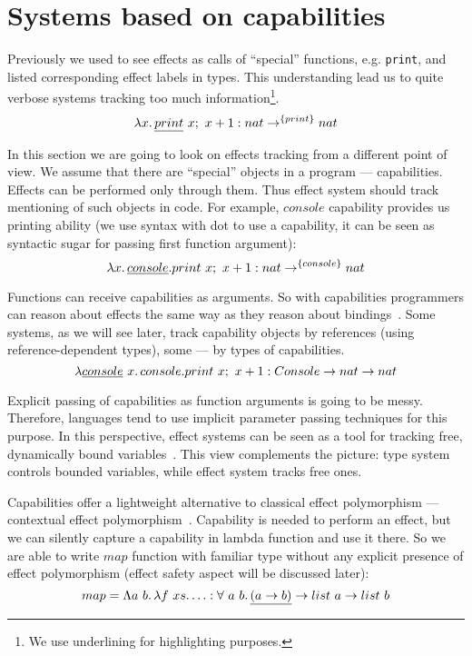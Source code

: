 \documentclass[conference]{IEEEtran}
\newcommand{\seq}{;~}
\newcommand{\ap}{~}
\begin{document}
    \section{Systems based on capabilities} \label{sec:capabilities}

    Previously we used to see effects as calls of ``special'' functions, e.g. \texttt{print}, and listed corresponding effect labels in types.
    This understanding lead us to quite verbose systems tracking too much information\footnote{We use underlining for highlighting purposes.}.
    \[\lambda x\ldotp \underline{print}\ap x\seq x + 1 : nat \to^{\{print\}} nat\]

    In this section we are going to look on effects tracking from a different point of view.
    We assume that there are ``special'' objects in a program --- capabilities.
    Effects can be performed only through them.
    Thus effect system should track mentioning of such objects in code.
    For example, $console$ capability provides us printing ability (we use syntax with dot to use a capability, it can be seen as syntactic sugar for passing first function argument):
    \[\lambda x\ldotp \underline{console}.print\ap x\seq x + 1 : nat \to^{\{console\}} nat\]

    Functions can receive capabilities as arguments.
    So with capabilities programmers can reason about effects the same way as they reason about bindings~\cite{brachthauser2022effects}.
    Some systems, as we will see later, track capability objects by references (using reference-dependent types), some --- by types of capabilities.
    \[\lambda \underline{console} \ap x \ldotp console.print\ap x\seq x + 1 : Console \to nat \to nat\]

    Explicit passing of capabilities as function arguments is going to be messy.
    Therefore, languages tend to use implicit parameter passing techniques for this purpose.
    In this perspective, effect systems can be seen as a tool for tracking free, dynamically bound variables~\cite{odersky2022scoped}.
    This view complements the picture: type system controls bounded variables, while effect system tracks free ones.

    Capabilities offer a lightweight alternative to classical effect polymorphism --- contextual effect polymorphism~\cite{brachthauser2022effects}.
    Capability is needed to perform an effect, but we can silently capture a capability in lambda function and use it there.
    So we are able to write $map$ function with familiar type without any explicit presence of effect polymorphism (effect safety aspect will be discussed later):
    \[map = \Lambda a \ap b\ldotp \lambda f\ap xs\ldotp \ldots : \forall \ap a \ap b\ldotp \underline{(a \to b)} \to list \ap a \to list \ap b \]
\end{document}
